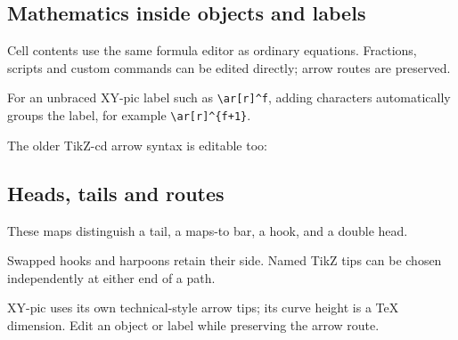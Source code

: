 \documentclass{article}
\begin{document}
\subsection{Mathematics inside objects and labels}
Cell contents use the same formula editor as ordinary equations. Fractions,
scripts and custom commands can be edited directly; arrow routes are preserved.
\begin{center}
\end{center}
For an unbraced XY-pic label such as \verb|\ar[r]^f|, adding characters
automatically groups the label, for example \verb|\ar[r]^{f+1}|.

The older TikZ-cd arrow syntax is editable too:
\begin{center}
\end{center}
\subsection{Heads, tails and routes}
These maps distinguish a tail, a maps-to bar, a hook, and a double head.
\begin{center}
\end{center}
Swapped hooks and harpoons retain their side. Named TikZ tips can be chosen
independently at either end of a path.
\begin{center}
\end{center}
\begin{center}
\end{center}
XY-pic uses its own technical-style arrow tips; its curve height is a
\TeX{} dimension. Edit an object or label while preserving the arrow route.
\end{document}

